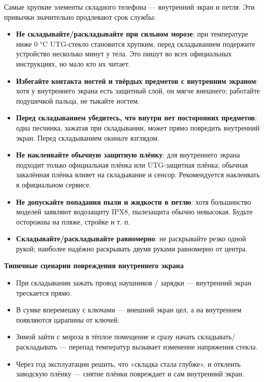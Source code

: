 
Самые хрупкие элементы складного телефона — внутренний экран и петля. Эти привычки значительно продлевают срок службы:

\begin{itemize}
  \item \textbf{Не складывайте/раскладывайте при сильном морозе}: при температуре ниже 0 °C UTG-стекло становится хрупким, перед складыванием подержите устройство несколько минут у тела. Это пишут во всех официальных инструкциях, но мало кто их читает.
  \item \textbf{Избегайте контакта ногтей и твёрдых предметов с внутренним экраном}: хотя у внутреннего экрана есть защитный слой, он мягче внешнего; работайте подушечкой пальца, не тыкайте ногтем.
  \item \textbf{Перед складыванием убедитесь, что внутри нет посторонних предметов}: одна песчинка, зажатая при складывании, может прямо повредить внутренний экран. Перед складыванием окиньте взглядом.
  \item \textbf{Не наклеивайте обычную защитную плёнку}: для внутреннего экрана подходит только официальная плёнка или UTG-защитная плёнка; обычная закалённая плёнка влияет на складывание и сенсор. Рекомендуется наклеивать в официальном сервисе.
  \item \textbf{Не допускайте попадания пыли и жидкости в петлю}: хотя большинство моделей заявляют водозащиту IPX8, пылезащита обычно невысокая. Будьте осторожны на пляже, стройке и т. п.
  \item \textbf{Складывайте/раскладывайте равномерно}: не раскрывайте резко одной рукой; наиболее надёжно раскрывать двумя руками равномерно от центра.
\end{itemize}

\textbf{Типичные сценарии повреждения внутреннего экрана}\par

\begin{itemize}
  \item При складывании зажать провод наушников / зарядки — внутренний экран трескается прямо.
  \item В сумке вперемешку с ключами — внешний экран цел, а на внутреннем появляются царапины от ключей.
  \item Зимой зайти с мороза в тёплое помещение и сразу начать складывать/раскладывать — перепад температур вызывает изменение напряжения стекла.
  \item Через год эксплуатации решить, что «складка стала глубже», и отклеить заводскую плёнку — снятие плёнки повреждает и сам внутренний экран.
\end{itemize}

